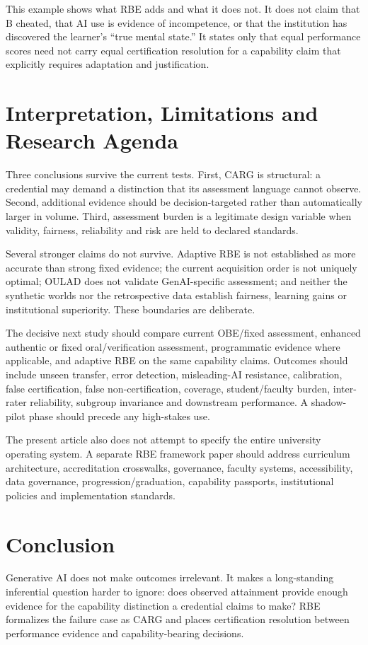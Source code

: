 \documentclass[11pt]{article}
\begin{document}
This example shows what RBE adds and what it does not. It does not claim that B cheated, that AI use is evidence of incompetence, or that the institution has discovered the learner's ``true mental state.'' It states only that equal performance scores need not carry equal certification resolution for a capability claim that explicitly requires adaptation and justification.

\section{Interpretation, Limitations and Research Agenda}
Three conclusions survive the current tests. First, CARG is structural: a credential may demand a distinction that its assessment language cannot observe. Second, additional evidence should be decision-targeted rather than automatically larger in volume. Third, assessment burden is a legitimate design variable when validity, fairness, reliability and risk are held to declared standards.

Several stronger claims do not survive. Adaptive RBE is not established as more accurate than strong fixed evidence; the current acquisition order is not uniquely optimal; OULAD does not validate GenAI-specific assessment; and neither the synthetic worlds nor the retrospective data establish fairness, learning gains or institutional superiority. These boundaries are deliberate.

The decisive next study should compare current OBE/fixed assessment, enhanced authentic or fixed oral/verification assessment, programmatic evidence where applicable, and adaptive RBE on the same capability claims. Outcomes should include unseen transfer, error detection, misleading-AI resistance, calibration, false certification, false non-certification, coverage, student/faculty burden, inter-rater reliability, subgroup invariance and downstream performance. A shadow-pilot phase should precede any high-stakes use.

The present article also does not attempt to specify the entire university operating system. A separate RBE framework paper should address curriculum architecture, accreditation crosswalks, governance, faculty systems, accessibility, data governance, progression/graduation, capability passports, institutional policies and implementation standards.

\section{Conclusion}
Generative AI does not make outcomes irrelevant. It makes a long-standing inferential question harder to ignore: does observed attainment provide enough evidence for the capability distinction a credential claims to make? RBE formalizes the failure case as CARG and places certification resolution between performance evidence and capability-bearing decisions.
\end{document}
